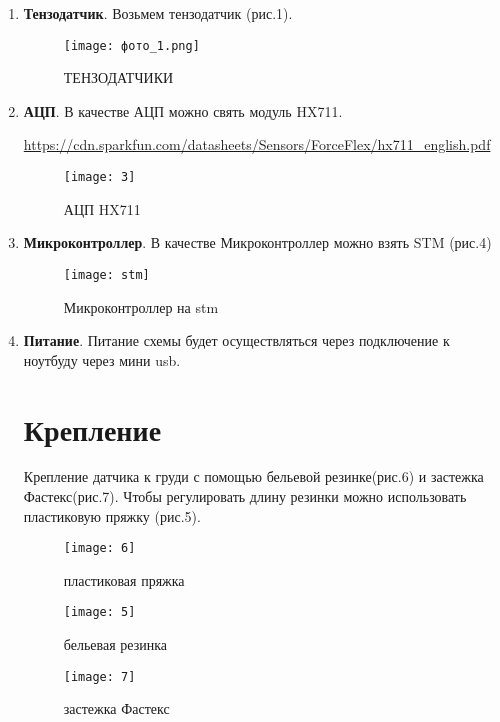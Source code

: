 \begin{enumerate}
\item \textbf{Тензодатчик}. Возьмем тензодатчик (рис.1).


	\begin{figure}[h]
		\centering
		\texttt{[image: фото\_1.png]}
		\caption{ТЕНЗОДАТЧИКИ}
	\end{figure}


\item \textbf{АЦП}. В качестве АЦП можно свять модуль HX711. 

\url{https://cdn.sparkfun.com/datasheets/Sensors/ForceFlex/hx711_english.pdf}

\newpage

	\begin{figure}[h]
		\centering
		\texttt{[image: 3]}
		\caption{АЦП HX711}
	\end{figure}

\item \textbf{Микроконтроллер}. В качестве Микроконтроллер можно взять STM (рис.4)

	\begin{figure}[h]
		\centering
		\texttt{[image: stm]}
		\caption{Микроконтроллер на stm}
	\end{figure}

\item \textbf{Питание}. Питание схемы будет осуществляться через подключение к ноутбуду через мини usb. 

\section{Крепление}

Крепление датчика к груди с помощью бельевой резинке(рис.6) и застежка Фастекс(рис.7). Чтобы регулировать длину резинки можно использовать пластиковую пряжку (рис.5).

	\begin{figure}[h]
		\centering
		\texttt{[image: 6]}
		\caption{пластиковая пряжка}
	\end{figure}

\newpage

\begin{figure}[h]
\begin{center}
\begin{minipage}[h]{0.4\linewidth}
\texttt{[image: 5]}
\caption{бельевая резинка} %
\label{ris:experimoriginal} %
\end{minipage}
\hfill
\begin{minipage}[h]{0.4\linewidth}
\texttt{[image: 7]}
\caption{застежка Фастекс}
\label{ris:experimcoded}
\end{minipage}
\end{center}
\end{figure}
\end{enumerate}
